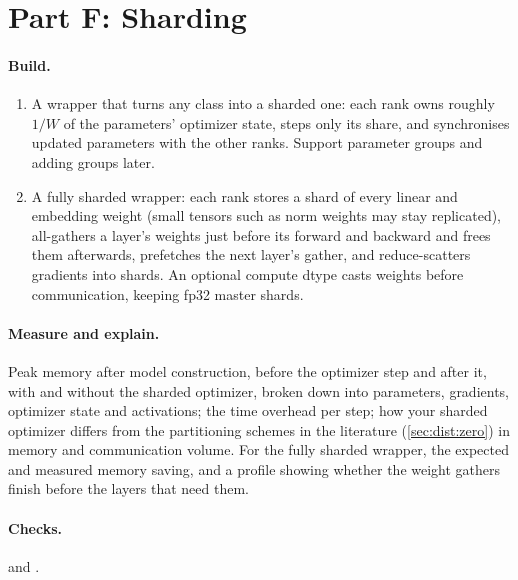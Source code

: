 \section{Part F: Sharding}\label{sec:proj2:f}

\paragraph{Build.}
\begin{enumerate}
\item A wrapper that turns any  class into a sharded one: each rank owns
  roughly $1/W$ of the parameters' optimizer state, steps only its share, and synchronises updated
  parameters with the other ranks. Support parameter groups and adding groups later.
\item A fully sharded wrapper: each rank stores a shard of every linear and embedding weight (small
  tensors such as norm weights may stay replicated), all-gathers a layer's weights just before its
  forward and backward and frees them afterwards, prefetches the next layer's gather, and
  reduce-scatters gradients into shards. An optional compute dtype casts weights before communication,
  keeping fp32 master shards.
\end{enumerate}

\paragraph{Measure and explain.} Peak memory after model construction, before the optimizer step and
after it, with and without the sharded optimizer, broken down into parameters, gradients, optimizer
state and activations; the time overhead per step; how your sharded optimizer differs from the
partitioning schemes in the literature (\cref{sec:dist:zero}) in memory and communication volume. For
the fully sharded wrapper, the expected and measured memory saving, and a profile showing whether
the weight gathers finish before the layers that need them.

\paragraph{Checks.}  and .

